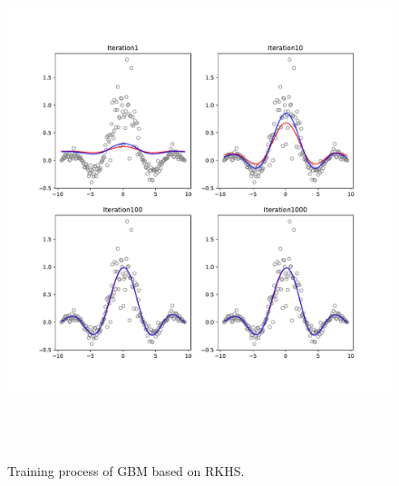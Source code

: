 \begin{figure}[htb]
	\centering
	\includegraphics[height=15cm]{figure/train_process_k.pdf}
	\caption{Training process of GBM based on RKHS.}
\end{figure}





